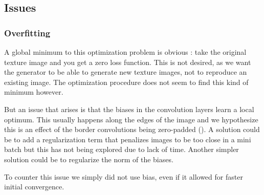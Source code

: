 \documentclass{article}
\begin{document}
\subsection{Issues}
\subsubsection{Overfitting}

A global minimum to this optimization problem is obvious : take the original texture image and you get a zero loss function. This is not desired, as we want the generator to be able to generate new texture images, not to reproduce an existing image. The optimization procedure does not seem to find this kind of minimum however.

But an issue that arises is that the biases in the convolution layers learn a local optimum. This usually happens along the edges of the image and we hypothesize this is an effect of the border convolutions being zero-padded (\label{fig:overfit}). A solution could be to add a regularization term that penalizes images to be too close in a mini batch but this has not being explored due to lack of time. Another simpler solution could be to regularize the norm of the biases.

To counter this issue we simply did not use bias, even if it allowed for faster initial convergence.
\end{document}
